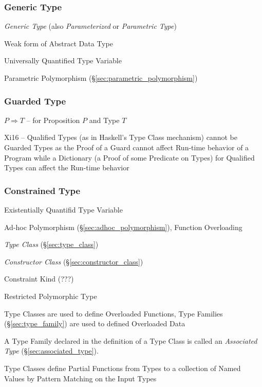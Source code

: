 \subsubsection{Generic Type}\label{sec:generic_type}

\emph{Generic Type} (also \emph{Parameterized} or \emph{Parametric
  Type})

Weak form of Abstract Data Type

Universally Quantified Type Variable

Parametric Polymorphism (\S\ref{sec:parametric_polymorphism})



\subsubsection{Guarded Type}\label{sec:guarded_type}

$P \Rightarrow T$ -- for Proposition $P$ and Type $T$

Xi16 -- Qualified Types (as in Haskell's Type Class mechanism) cannot
be Guarded Types as the Proof of a Guard cannot affect Run-time
behavior of a Program while a Dictionary (a Proof of some Predicate on
Types) for Qualified Types can affect the Run-time behavior



\subsubsection{Constrained Type}\label{sec:constrained_type}

Existentially Quantifid Type Variable

Ad-hoc Polymorphism (\S\ref{sec:adhoc_polymorphism}), Function
Overloading

\emph{Type Class} (\S\ref{sec:type_class})

\emph{Constructor Class} (\S\ref{sec:constructor_class})

Constraint Kind (???) %

Restricted Polymorphic Type %

Type Classes are used to define Overloaded Functions, Type Families
(\S\ref{sec:type_family}) are used to defined Overloaded Data

A Type Family declared in the definition of a Type Class is called an
\emph{Associated Type} (\S\ref{sec:associated_type}).

Type Classes define Partial Functions from Types to a collection of
Named Values by Pattern Matching on the Input Types

